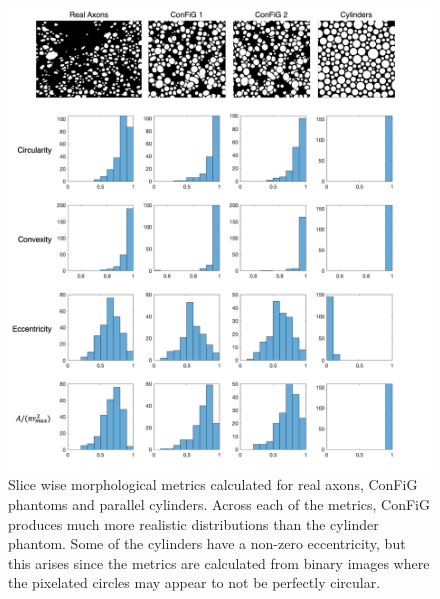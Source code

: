 \begin{figure}
  \centering
  \includegraphics[width=\textwidth]{figures/config/slice_wise_metrics_whitebg.png}
  \caption[Slice-wise microstructural measurements]{Slice wise morphological metrics calculated for real axons, ConFiG phantoms and parallel cylinders. Across each of the metrics, ConFiG produces much more realistic distributions than  the cylinder phantom. Some of the cylinders have a non-zero eccentricity, but this arises since the metrics are calculated from binary images where the pixelated circles may appear to not be perfectly circular.}
  \label{fig:config_res_slice_wise_metrics}
\end{figure}

